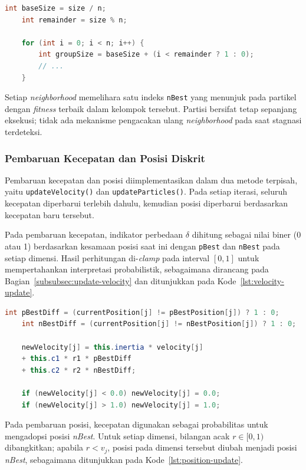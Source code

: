 \begin{lstlisting}[language=Java, caption=Distribusi ukuran kelompok \textit{neighborhood}, label={lst:neighborhood-distribution}]
	int baseSize = size / n;
	int remainder = size % n;
	
	for (int i = 0; i < n; i++) {
		int groupSize = baseSize + (i < remainder ? 1 : 0);
		// ...
	}
\end{lstlisting}

Setiap \textit{neighborhood} memelihara satu indeks \texttt{nBest} yang menunjuk pada partikel dengan \textit{fitness} terbaik dalam kelompok tersebut. Partisi bersifat tetap sepanjang eksekusi; tidak ada mekanisme pengacakan ulang \textit{neighborhood} pada saat stagnasi terdeteksi.

\subsubsection{Pembaruan Kecepatan dan Posisi Diskrit}

Pembaruan kecepatan dan posisi diimplementasikan dalam dua metode terpisah, yaitu \texttt{updateVelocity()} dan \texttt{updateParticles()}. Pada setiap iterasi, seluruh kecepatan diperbarui terlebih dahulu, kemudian posisi diperbarui berdasarkan kecepatan baru tersebut.

Pada pembaruan kecepatan, indikator perbedaan $\delta$ dihitung sebagai nilai biner (0 atau 1) berdasarkan kesamaan posisi saat ini dengan \texttt{pBest} dan \texttt{nBest} pada setiap dimensi. Hasil perhitungan di-\textit{clamp} pada interval $[0, 1]$ untuk mempertahankan interpretasi probabilistik, sebagaimana dirancang pada Bagian~\ref{subsubsec:update-velocity} dan ditunjukkan pada Kode~\ref{lst:velocity-update}.

\begin{lstlisting}[language=Java, caption=Pembaruan kecepatan diskrit dengan \textit{clamping}, label={lst:velocity-update}]
	int pBestDiff = (currentPosition[j] != pBestPosition[j]) ? 1 : 0;
	int nBestDiff = (currentPosition[j] != nBestPosition[j]) ? 1 : 0;
	
	newVelocity[j] = this.inertia * velocity[j] 
	+ this.c1 * r1 * pBestDiff 
	+ this.c2 * r2 * nBestDiff;
	
	if (newVelocity[j] < 0.0) newVelocity[j] = 0.0;
	if (newVelocity[j] > 1.0) newVelocity[j] = 1.0;
\end{lstlisting}

Pada pembaruan posisi, kecepatan digunakan sebagai probabilitas untuk mengadopsi posisi \textit{nBest}. Untuk setiap dimensi, bilangan acak $r \in [0, 1)$ dibangkitkan; apabila $r < v_j$, posisi pada dimensi tersebut diubah menjadi posisi \textit{nBest}, sebagaimana ditunjukkan pada Kode~\ref{lst:position-update}.

